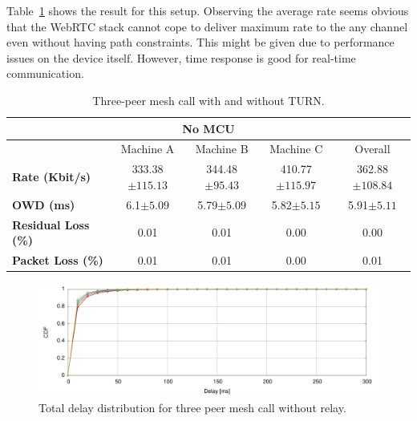 Table~\ref{fig:mesh_results_no_mcu} shows the result for this setup. Observing the average rate seems obvious that the WebRTC stack cannot cope to deliver maximum rate to the any channel even without having path constraints. This might be given due to performance issues on the device itself. However, time response is good for real-time communication.

\begin{table}[h]
\begin{center}
\begin{adjustwidth}{-1.2em}{}
	\begin{tabular}{|l|c|c|c|c| }
	\hline
	\multicolumn{5}{|c|}{\textbf{No MCU}} \\ \hline
    	 & Machine A & Machine B & Machine C & Overall \\ \hline
 \textbf{Rate (Kbit/s)} & 333.38$\pm115.13$ & 344.48$\pm95.43$ & 410.77$\pm115.97$ & 362.88$\pm108.84$\\\hline
 \textbf{OWD (ms)} &  6.1$\pm5.09$ & 5.79$\pm5.09$ & 5.82$\pm5.15$ & 5.91$\pm5.11$\\\hline
 \textbf{Residual Loss (\%)} & 0.01 & 0.01 & 0.00 & 0.00\\\hline
 \textbf{Packet Loss (\%)} & 0.01 & 0.01 & 0.00 & 0.01 \\ \hline
	\end{tabular}
\end{adjustwidth}
    \caption[Three-peer mesh call with and without TURN]{Three-peer mesh call with and without TURN.}
    \label{fig:mesh_results_no_mcu}
\end{center}
\end{table}

\begin{figure}[h]
  \centering
    \includegraphics[width=1\textwidth]{./figures/mesh_total_delay_distribution.pdf}
      \caption[Total delay distribution for three peer mesh call without relay]{Total delay distribution for three peer mesh call without relay.}
	\label{fig:delayThreeMesh}
\end{figure}

